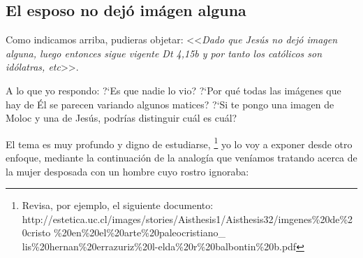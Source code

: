 \documentclass{article}
\begin{document}
\subsection{El esposo no dej\'o im\'agen alguna}

Como indicamos arriba, pudieras objetar: <<\emph{Dado que Jes\'us no dej\'o imagen alguna, luego entonces sigue vigente Dt 4,15b y por tanto los cat\'olicos son id\'olatras, etc}>>.

A lo que yo respondo: ?`Es que nadie lo vio? ?`Por qu\'e todas las im\'agenes que hay de \'El se parecen variando algunos matices? ?`Si te pongo una imagen de Moloc y una de Jes\'us, podr\'{i}as distinguir cu\'al es cu\'al?

El tema es muy profundo y digno de estudiarse,%
    \footnote{Revisa, por ejemplo, el siguiente documento:\\
    http://estetica.uc.cl/images/stories/Aisthesis1/Aisthesis32/imgenes\%20de\%20cristo
    \%20en\%20el\%20arte\%20paleocristiano\_\\
    lis\%20hernan\%20errazuriz\%20l-elda\%20r\%20balbontin\%20b.pdf}
yo lo voy a exponer desde otro enfoque, mediante la continuaci\'on de la analog\'{i}a que ven\'{i}amos tratando acerca de la mujer desposada con un hombre cuyo rostro ignoraba:
\end{document}
